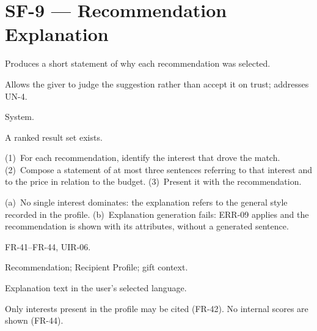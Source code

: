 \documentclass[11pt,a4paper]{report}
\begin{document}
\section{SF-9 --- Recommendation Explanation}
\begin{description}[style=nextline,leftmargin=0pt]
\item[Description] Produces a short statement of why each recommendation was selected.
\item[Purpose] Allows the giver to judge the suggestion rather than accept it on trust; addresses UN-4.
\item[Actors] System.
\item[Preconditions] A ranked result set exists.
\item[Main flow] (1)~For each recommendation, identify the interest that drove the match. (2)~Compose a statement of at most three sentences referring to that interest and to the price in relation to the budget. (3)~Present it with the recommendation.
\item[Alternative and exception flows] (a)~No single interest dominates: the explanation refers to the general style recorded in the profile. (b)~Explanation generation fails: ERR-09 applies and the recommendation is shown with its attributes, without a generated sentence.
\item[Requirements] FR-41--FR-44, UIR-06.
\item[Inputs] Recommendation; Recipient Profile; gift context.
\item[Outputs] Explanation text in the user's selected language.
\item[Constraints] Only interests present in the profile may be cited (FR-42). No internal scores are shown (FR-44).
\end{description}
\end{document}
